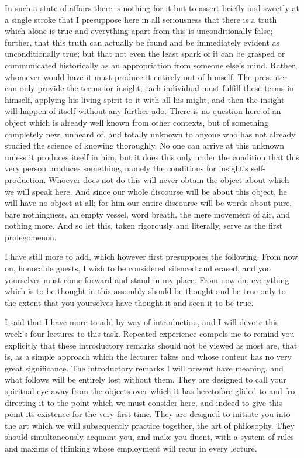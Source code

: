 In such a state of affairs there is nothing for it
but to assert briefly and sweetly at a single stroke
that I presuppose here in all seriousness that
there is a truth which alone is true and
everything apart from this is unconditionally false;
further, that this truth can actually be found
and be immediately evident as unconditionally true;
but that not even the least spark of it can be
grasped or communicated historically as
an appropriation from someone else's mind.
Rather, whomever would have it must
produce it entirely out of himself.
The presenter can only provide the terms for insight;
each individual must fulfill these terms in himself,
applying his living spirit to it with all his might,
and then the insight will happen of itself without any further ado.
There is no question here of an object
which is already well known from other contexts,
but of something completely new, unheard of, and totally unknown to anyone
who has not already studied the science of knowing thoroughly.
No one can arrive at this unknown unless it produces itself in him,
but it does this only under the condition that this very person
produces something, namely the conditions for insight's self-production.
Whoever does not do this will never obtain
the object about which we will speak here.
And since our whole discourse will be about this object,
he will have no object at all;
for him our entire discourse will be words about pure,
bare nothingness, an empty vessel, word breath,
the mere movement of air, and nothing more.
And so let this, taken rigorously and literally,
serve as the first prolegomenon.

I have still more to add, which however first presupposes the following.
From now on, honorable guests, I wish to be considered silenced and erased,
and you yourselves must come forward and stand in my place.
From now on, everything which is to be thought in this assembly
should be thought and be true only to the extent that
you yourselves have thought it and seen it to be true.

I said that I have more to add by way of introduction,
and I will devote this week's four lectures to this task.
Repeated experience compels me to remind you explicitly that
these introductory remarks should not be viewed as most are,
that is, as a simple approach which the lecturer takes and
whose content has no very great significance.
The introductory remarks I will present have meaning,
and what follows will be entirely lost without them.
They are designed to call your spiritual eye
away from the objects over which it has heretofore glided to and fro,
directing it to the point which we must consider here, and
indeed to give this point its existence for the very first time.
They are designed to initiate you into the art
which we will subsequently practice together,
the art of philosophy.
They should simultaneously acquaint you, and make you fluent,
with a system of rules and maxims of thinking whose
employment will recur in every lecture.


